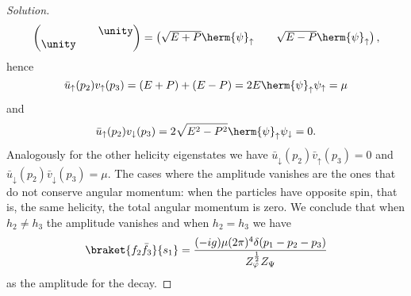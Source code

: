 \begin{proof}[Solution]
\begin{equation*}
\begin{pmatrix}
         && \unity\\
         \unity &&
      \end{pmatrix} = 
      \begin{pmatrix}
         \sqrt{E + P} \herm{\psi}_{\uparrow} && \sqrt{E - P}\herm{\psi}_{\uparrow}
      \end{pmatrix},
   \end{equation*}
   hence
   \begin{equation*}
      \bar{u}_{\uparrow}(p_2) v_\uparrow(p_3) = (E + P) + (E - P) = 2E \herm{\psi}_{\uparrow}\psi_{\uparrow} = \mu
   \end{equation*}
   and
   \begin{equation*}
      \bar{u}_{\uparrow}(p_2) v_{\downarrow}(p_3) = 2\sqrt{E^2 - P^2} \herm{\psi}_{\uparrow} \psi_{\downarrow} = 0.
   \end{equation*}
   Analogously for the other helicity eigenstates we have \(\bar{u}_{\downarrow}(p_2)\bar{v}_{\uparrow}(p_3) = 0\) and \(\bar{u}_{\downarrow}(p_2)\bar{v}_{\downarrow}(p_3) = \mu.\) The cases where the amplitude vanishes are the ones that do not conserve angular momentum: when the particles have opposite spin, that is, the same helicity, the total angular momentum is zero. We conclude that when \(h_2 \neq h_3\) the amplitude vanishes and when \(h_2 = h_3\) we have
   \begin{equation*}
      \braket{f_2 \bar{f}_3}{s_1} = \frac{(-ig)\mu (2\pi)^4 \delta(p_1 - p_2 - p_3)}{Z_\varphi^{\frac12}Z_\Psi}
   \end{equation*}
   as the amplitude for the decay.
\end{proof}
